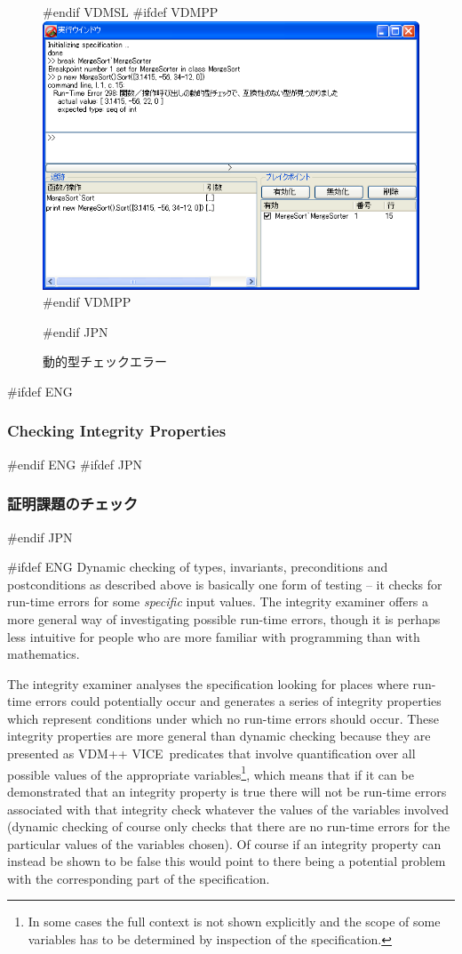 \documentclass[\pformat,12pt]{article}
\newcommand{\vdmslpp}{VDM-SL}
\newcommand{\vdmslpp}{VDM++}
\renewcommand{\vdmslpp}{VDM++ VICE}
\begin{document}
\begin{figure}[tbh]
\begin{center}
#endif VDMSL
#ifdef VDMPP
\includegraphics[width=12.5cm]{dynamicTCError-pp.png}
#endif VDMPP
\caption{動的型チェックエラー}
#endif JPN
\label{fig:dtcerror}
\end{center}
\end{figure}

#ifdef ENG
\subsubsection{Checking Integrity Properties}\label{pogWalk}
#endif ENG
#ifdef JPN
\subsubsection{証明課題のチェック}\label{pogWalk}
#endif JPN

#ifdef ENG
Dynamic checking of types, invariants, preconditions and
postconditions as described above is basically one form of testing --
it checks for run-time errors for some \emph{specific} input
values. The integrity examiner offers a more general way of
investigating possible run-time errors, though it is perhaps less
intuitive for people who are more familiar with programming than with
mathematics.

The integrity examiner analyses the specification looking for places
where run-time errors could potentially occur and generates a series
of integrity properties which represent conditions under which no
run-time errors should occur. These integrity properties are more
general than dynamic checking because they are presented as
 \vdmslpp\ predicates that involve quantification over all
possible values of the appropriate variables\footnote{In some cases
  the full context is not shown explicitly and the scope of some
  variables has to be determined by inspection of the specification.},
which means that if it 
can be demonstrated that an integrity property is true there will
not be run-time errors associated with that integrity check whatever
the values of the variables involved (dynamic checking of course
only checks that there are no run-time errors for the particular
values of the variables chosen). Of course if an integrity property
can instead be shown to be false this would point to there being a
potential problem with the corresponding part of the specification.
\end{document}
